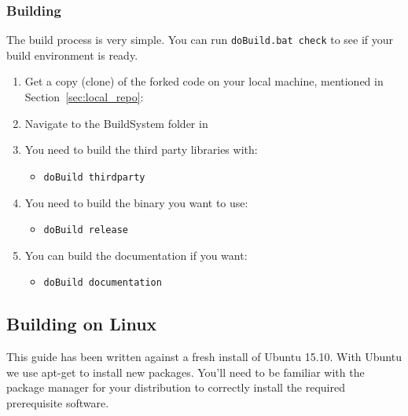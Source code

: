 \subsubsection{Building \CNAME}
The build process is very simple. You can run \texttt{doBuild.bat check} to see if your build environment is ready.
\begin{enumerate}
\item Get a copy (clone) of the forked code on your local machine, mentioned in Section~\ref{sec:local_repo}: 
	
	\item Navigate to the BuildSystem folder in 
	\item You need to build the third party libraries with:
	\begin{itemize}
		\item \texttt{doBuild thirdparty}
	\end{itemize}
	\item You need to build the binary you want to use:
	\begin{itemize}
		\item \texttt{doBuild release}
	\end{itemize}	
	
	\item You can build the documentation if you want:
	\begin{itemize}
		\item \texttt{doBuild documentation}
	\end{itemize}		
\end{enumerate}

\subsection{Building on Linux}
This guide has been written against a fresh install of Ubuntu 15.10. With Ubuntu we use apt-get to install new packages. You’ll need to be familiar with the package manager for your distribution to correctly install the required prerequisite software.
